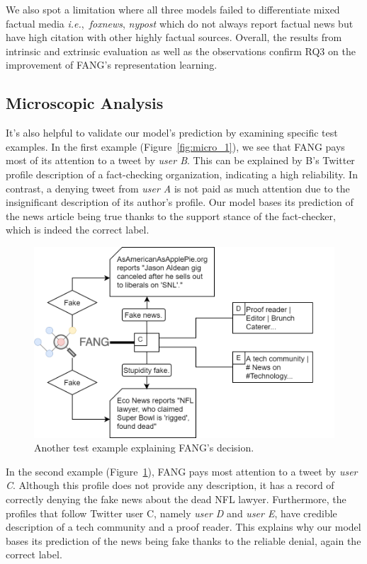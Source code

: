 \documentclass[sigconf,anonymous]{acmart}
\theoremstyle{definition}
\theoremstyle{hypothesis}
\begin{document}
We also spot a limitation where all three models failed to differentiate mixed factual media \textit{i.e.},~\textit{foxnews}, \textit{nypost} which do not always report factual news but have high citation with other highly factual sources.
Overall, the results from intrinsic and extrinsic evaluation as well as the observations confirm RQ3 on the improvement of FANG's representation learning.


\subsection{Microscopic Analysis}

It's also helpful to validate our model's prediction by examining specific test examples.  In the first example (Figure~\ref{fig:micro_1}),
we see that FANG pays most of its attention to a tweet by \textit{user B}. This can be explained by B's Twitter profile description of a fact-checking organization, indicating a high reliability. In contrast, a denying tweet from \textit{user A} is not paid as much attention due to the insignificant description of its author's profile. Our model bases its prediction of the news article being true thanks to the support stance of the fact-checker, which is indeed the correct label.

\begin{figure}[t]
\centering
\includegraphics[scale=0.25]{micro2_chart.png}
\caption{Another test example explaining FANG's decision.}
\label{fig:micro_2}
\end{figure}

In the second example (Figure~\ref{fig:micro_2}), 
FANG pays most attention to a tweet by \textit{user C}. Although this profile does not provide any description, it has a record of correctly denying the fake news about the dead NFL lawyer. Furthermore, the profiles that follow Twitter user C, namely \textit{user D} and \textit{user E}, have credible description of a tech community and a proof reader. This explains why our model bases its prediction of the news being fake thanks to the reliable denial, again the correct label.
\end{document}
